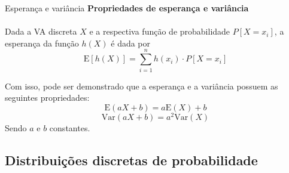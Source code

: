 \documentclass[10pt]{beamer}\usepackage[]{graphicx}\usepackage[]{color}
\providecommand{\E}{\text{E}}
\providecommand{\Var}{\text{Var}}
\theoremstyle{definition}
\begin{document}
\begin{frame}[fragile]{Esperança e variância}
  \textbf{Propriedades de esperança e variância} \\~\\
  Dada a VA discreta $X$ e a respectiva função de probabilidade $P[X =
  x_i]$, a esperança da função $h(X)$ é dada por
  \begin{equation*}
    \E[h(X)] = \sum_{i = 1}^{n} h(x_{i}) \cdot P[X = x_i]
  \end{equation*}
  \vspace{1em}

  Com isso, pode ser demonstrado que a esperança e a variância possuem
  as seguintes propriedades:
  \begin{equation*}
    \E(aX + b) = a\E(X) + b
  \end{equation*}
  \vspace{1em}
  \begin{equation*}
    \Var(aX + b) = a^2\Var(X)
  \end{equation*}
  \vspace{1em}
  Sendo $a$ e $b$ constantes.
\end{frame}




\subsection[Distribuições Discretas]{Distribuições discretas de
  probabilidade}
\end{document}
